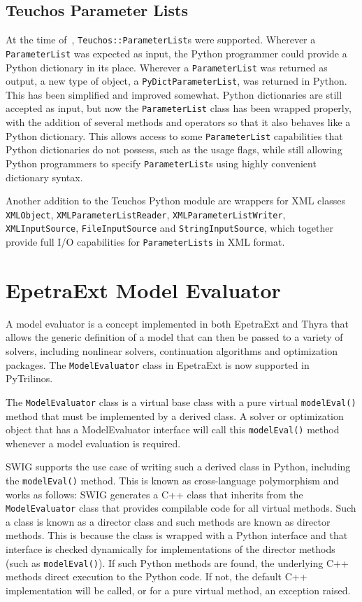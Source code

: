 \documentclass[11pt]{article}
\begin{document}
\subsection{Teuchos Parameter Lists}
\label{sec:teuchos_parameterlists}

At the time of~\cite{PyTrilinos}, {\tt Teuchos::ParameterList}s were supported.  Wherever a {\tt ParameterList} was expected as input, the Python programmer could provide a Python dictionary in its place.  Wherever a {\tt ParameterList} was returned as output, a new type of object, a {\tt PyDictParameterList}, was returned in Python.  This has been simplified and improved somewhat.  Python dictionaries are still accepted as input, but now the {\tt ParameterList} class has been wrapped properly, with the addition of several methods and operators so that it also behaves like a Python dictionary.  This allows access to some {\tt ParameterList} capabilities that Python dictionaries do not possess, such as the usage flags, while still allowing Python programmers to specify {\tt ParameterList}s using highly convenient dictionary syntax.

Another addition to the Teuchos Python module are wrappers for XML classes {\tt XMLObject}, {\tt XMLPa\-rameterListReader}, {\tt XMLParameterListWriter}, {\tt XMLInputSource}, {\tt FileInputSource} and {\tt String\-InputSource}, which together provide full I/O capabilities for {\tt ParameterLists} in XML format.

\section{EpetraExt Model Evaluator}
\label{sec:modelevaluator}

A model evaluator is a concept implemented in both EpetraExt and Thyra that allows the generic definition of a model that can then be passed to a variety of solvers, including nonlinear solvers, continuation algorithms and optimization packages.  The {\tt ModelEvaluator} class in EpetraExt is now supported in PyTrilinos.

The {\tt ModelEvaluator} class is a virtual base class with a pure virtual {\tt modelEval()} method that must be implemented by a derived class.  A solver or optimization object that has a ModelEvaluator interface will call this {\tt modelEval()} method whenever a model evaluation is required.

SWIG supports the use case of writing such a derived class in Python, including the {\tt modelEval()} method.  This is known as cross-language polymorphism and works as follows:  SWIG generates a C++ class that inherits from the {\tt ModelEvaluator} class that provides compilable code for all virtual methods.  Such a class is known as a director class and such methods are known as director methods.  This is because the class is wrapped with a Python interface and that interface is checked dynamically for implementations of the director methods (such as {\tt modelEval()}).  If such Python methods are found, the underlying C++ methods direct execution to the Python code.  If not, the default C++ implementation will be called, or for a pure virtual method, an exception raised.
\end{document}
